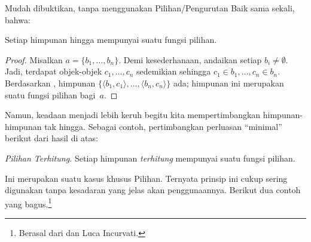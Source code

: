 \documentclass[../../../include/open-logic-section]{subfiles}
\begin{document}

Mudah dibuktikan, tanpa menggunakan Pilihan/Pengurutan Baik sama sekali,
bahwa:

\begin{lem}
Setiap himpunan hingga mempunyai suatu fungsi pilihan.
\end{lem}

\begin{proof}
Misalkan $a = \{b_1, \ldots, b_n\}$. Demi kesederhanaan, andaikan setiap
$b_i\neq\emptyset$. Jadi, terdapat objek-objek $c_1,\ldots,c_n$ sedemikian
sehingga $c_1\in b_1,\ldots,c_n\in b_n$. Berdasarkan
, himpunan
$\{\langle b_1,c_1\rangle,\ldots,\langle b_n,c_n\rangle\}$ ada; himpunan
ini merupakan suatu fungsi pilihan bagi~$a$.
\end{proof}

Namun, keadaan menjadi lebih keruh begitu kita mempertimbangkan
himpunan-himpunan tak hingga. Sebagai contoh, pertimbangkan perluasan
``minimal'' berikut dari hasil di atas:

\begin{defish}
\emph{Pilihan Terhitung.} Setiap himpunan \emph{terhitung} mempunyai suatu
fungsi pilihan.
\end{defish}

Ini merupakan suatu kasus khusus Pilihan. Ternyata prinsip ini cukup sering
digunakan tanpa kesadaran yang jelas akan penggunaannya. Berikut dua contoh
yang bagus.\footnote{Berasal dari \citet[\S9.4]{Potter2004} dan Luca
Incurvati.}
\end{document}
